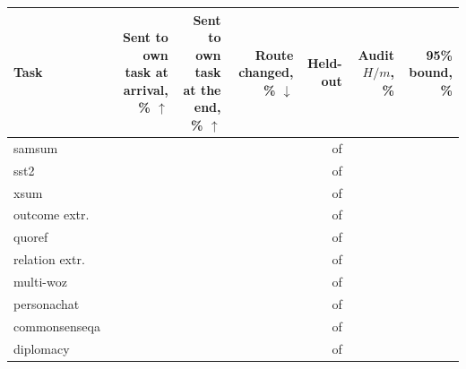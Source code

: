 {\footnotesize\setlength{\tabcolsep}{3pt}\begin{tabular}{lrrrrrr}
    \toprule
    Task & \shortstack[r]{Sent to\\own task\\at arrival,\\\% $\uparrow$} & \shortstack[r]{Sent to\\own task\\at the end,\\\% $\uparrow$} & \shortstack[r]{Route\\changed,\\\% $\downarrow$} & Held-out & \shortstack[r]{Audit\\$H/m$, \%} & \shortstack[r]{95\% bound,\\\%} \\
    \midrule
    samsum & \AudPtOneArrive{} & \AudPtOneEnd{} & \AudPtOneChanged{} & \AudPtOneC{} of \AudPtOneM{} & \AudPtOneAuditEst{} & \AudPtOneBound{} \\
    sst2 & \AudPtTwoArrive{} & \AudPtTwoEnd{} & \AudPtTwoChanged{} & \AudPtTwoC{} of \AudPtTwoM{} & \AudPtTwoAuditEst{} & \AudPtTwoBound{} \\
    xsum & \AudPtThreeArrive{} & \AudPtThreeEnd{} & \AudPtThreeChanged{} & \AudPtThreeC{} of \AudPtThreeM{} & \AudPtThreeAuditEst{} & \AudPtThreeBound{} \\
    outcome extr. & \AudPtFourArrive{} & \AudPtFourEnd{} & \AudPtFourChanged{} & \AudPtFourC{} of \AudPtFourM{} & \AudPtFourAuditEst{} & \AudPtFourBound{} \\
    quoref & \AudPtFiveArrive{} & \AudPtFiveEnd{} & \AudPtFiveChanged{} & \AudPtFiveC{} of \AudPtFiveM{} & \AudPtFiveAuditEst{} & \AudPtFiveBound{} \\
    relation extr. & \AudPtSixArrive{} & \AudPtSixEnd{} & \AudPtSixChanged{} & \AudPtSixC{} of \AudPtSixM{} & \AudPtSixAuditEst{} & \AudPtSixBound{} \\
    multi-woz & \AudPtSevenArrive{} & \AudPtSevenEnd{} & \AudPtSevenChanged{} & \AudPtSevenC{} of \AudPtSevenM{} & \AudPtSevenAuditEst{} & \AudPtSevenBound{} \\
    personachat & \AudPtEightArrive{} & \AudPtEightEnd{} & \AudPtEightChanged{} & \AudPtEightC{} of \AudPtEightM{} & \AudPtEightAuditEst{} & \AudPtEightBound{} \\
    commonsenseqa & \AudPtNineArrive{} & \AudPtNineEnd{} & \AudPtNineChanged{} & \AudPtNineC{} of \AudPtNineM{} & \AudPtNineAuditEst{} & \AudPtNineBound{} \\
    diplomacy & \AudPtTenArrive{} & \AudPtTenEnd{} & \AudPtTenChanged{} & \AudPtTenC{} of \AudPtTenM{} & \AudPtTenAuditEst{} & \AudPtTenBound{} \\

\end{tabular}}
